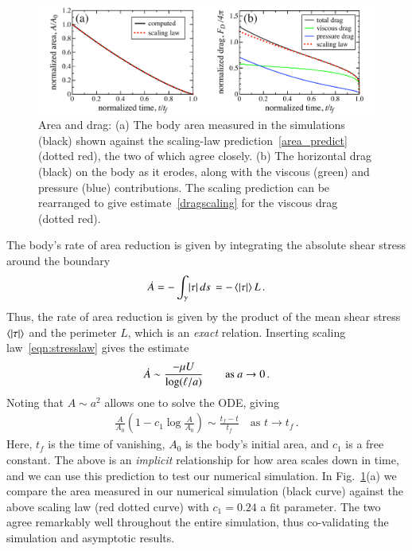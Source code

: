 \documentclass[preprint, 10pt]{elsarticle}
\begin{document}
\begin{figure}%
\begin{center}
\includegraphics[width = 0.9 \textwidth]{./figs/area_drag.pdf}
\caption{Area and drag: (a) The body area measured in the simulations (black) shown against the scaling-law prediction~\eqref{area_predict} (dotted red), the two of which agree closely. (b) The horizontal drag (black) on the body as it erodes, along with the viscous (green) and pressure (blue) contributions. The scaling prediction can be rearranged to give estimate~\eqref{dragscaling} for the viscous drag (dotted red).}
\label{area_drag}
\end{center}
\end{figure}

The body's rate of area reduction is given by integrating the absolute shear stress around the boundary
\begin{align}
\dot{A} = - \int_{\gamma} \lvert \tau \rvert \, ds \,  = - \left< \lvert \tau \rvert \right> L \, .
\end{align}
Thus, the rate of area reduction is given by the product of the mean shear stress $\left< \lvert \tau \rvert \right>$ and the perimeter $L$, which is an {\em exact} relation. Inserting scaling law~\eqref{eqn:stresslaw} gives the estimate
\begin{align}
\dot{A} \sim \frac{ - \mu U}{\log(\ell/a)} \qquad \text{as } a \to 0 \, . 
\end{align}
Noting that $A \sim a^2$ allows one to solve the ODE, giving
\begin{align}
\label{area_predict}
\frac{A}{A_0} \left( 1 - c_1 \log{\frac{A}{A_0}} \right) \sim \frac{t_f - t}{t_f} \quad \text{as } t \to t_f \, .
\end{align}
Here, $t_f$ is the time of vanishing, $A_0$ is the body's initial area, and $c_1$ is a free constant. The above is an {\em implicit} relationship for how area scales down in time, and we can use this prediction to test our numerical simulation. In Fig.~\ref{area_drag}(a) we compare the area measured in our numerical simulation (black curve) against the above scaling law (red dotted curve) with $c_1 = 0.24$ a fit parameter. The two agree remarkably well throughout the entire simulation, thus co-validating the simulation and asymptotic results.
\end{document}
